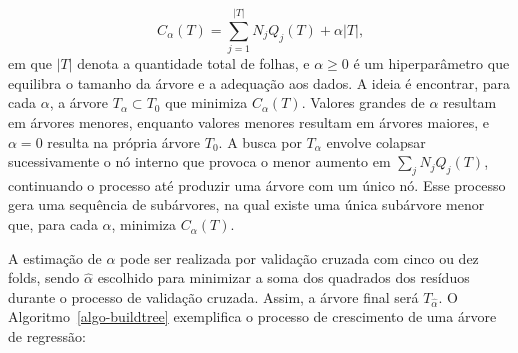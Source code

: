 \documentclass[
  12pt,
  a4paper,
]{scrreprt}
\begin{document}
\[
C_{\alpha}\left(T\right) = \sum_{j = 1}^{|T|}N_jQ_j\left(T\right) + \alpha |T|\text{,}
\] em que \(|T|\) denota a quantidade total de folhas, e
\(\alpha \geq 0\) é um hiperparâmetro que equilibra o tamanho da árvore
e a adequação aos dados. A ideia é encontrar, para cada \(\alpha\), a
árvore \(T_{\alpha} \subset T_0\) que minimiza
\(C_{\alpha}\left(T\right)\). Valores grandes de \(\alpha\) resultam em
árvores menores, enquanto valores menores resultam em árvores maiores, e
\(\alpha = 0\) resulta na própria árvore \(T_0\). A busca por
\(T_{\alpha}\) envolve colapsar sucessivamente o nó interno que provoca
o menor aumento em \(\sum_j N_j Q_j\left(T\right)\), continuando o
processo até produzir uma árvore com um único nó. Esse processo gera uma
sequência de subárvores, na qual existe uma única subárvore menor que,
para cada \(\alpha\), minimiza \(C_{\alpha}\left(T\right)\).

\vspace{12pt}

A estimação de \(\alpha\) pode ser realizada por validação cruzada com
cinco ou dez folds, sendo \(\hat \alpha\) escolhido para minimizar a
soma dos quadrados dos resíduos durante o processo de validação cruzada.
Assim, a árvore final será \(T_{\hat \alpha}\). O
 Algoritmo~\ref{algo-buildtree}  exemplifica o processo de crescimento
de uma árvore de regressão:
\end{document}
